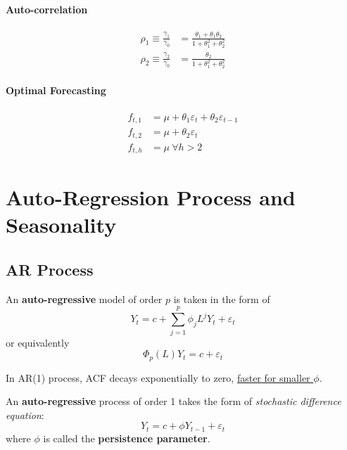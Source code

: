 \documentclass[11pt]{article}
\begin{document}
			\paragraph{Auto-correlation}
				\begin{align}
					\rho_1 \equiv \frac{\gamma_1}{\gamma_0} &= \frac{\theta_1 + \theta_1 \theta_2}{1 + \theta_1^2 + \theta_2^2} \\
					\rho_2 \equiv \frac{\gamma_2}{\gamma_0} &= \frac{\theta_2}{1 + \theta_1^2 + \theta_2^2}
				\end{align}
			\paragraph{Optimal Forecasting}
				\begin{align}
					f_{t, 1} &= \mu + \theta_1 \varepsilon_t + \theta_2 \varepsilon_{t-1} \\
					f_{t, 2} &= \mu + \theta_2 \varepsilon_t \\
					f_{t, h} &= \mu\ \forall h > 2
				\end{align}
	
	\section{Auto-Regression Process and Seasonality}
		\subsection{AR Process}
			\begin{definition}
				An \textbf{auto-regressive} model of order $p$ is taken in the form of 
				\begin{equation}
					Y_t = c + \sum_{j=1}^p \phi_j L^j Y_t + \varepsilon_t
				\end{equation}
				or equivalently
				\begin{equation}
					\Phi_p(L) Y_t = c + \varepsilon_t
				\end{equation}
			\end{definition}
			
			\begin{remark}
				In AR(1) process, ACF decays exponentially to zero, \ul{faster for smaller $\phi$}.
			\end{remark}
			
			\begin{definition}
				An \textbf{auto-regressive} process of order 1 takes the form of \emph{stochastic difference equation}:
				\begin{equation}
					Y_t = c + \phi Y_{t-1} + \varepsilon_t
				\end{equation}
				where $\phi$ is called the \textbf{persistence parameter}.
			\end{definition}
		
\end{document}
